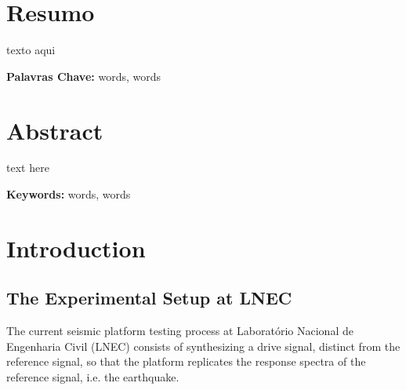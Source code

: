 \documentclass[9pt]{extarticle}
\begin{document}
 

    






\section{Resumo}

texto aqui

\textbf{Palavras Chave:} words, words

\clearpage
\section{Abstract}

text here

\textbf{Keywords:} words, words

\clearpage
\tableofcontents %

\listoftables %
    
\listoffigures %



\clearpage
\section{Introduction}

\subsection{The Experimental Setup at LNEC}
The current seismic platform testing process at Laboratório Nacional de Engenharia Civil (LNEC) consists of synthesizing a drive signal, distinct from the reference signal, so that the platform replicates the response spectra of the reference signal, i.e. the earthquake. %
\end{document}
